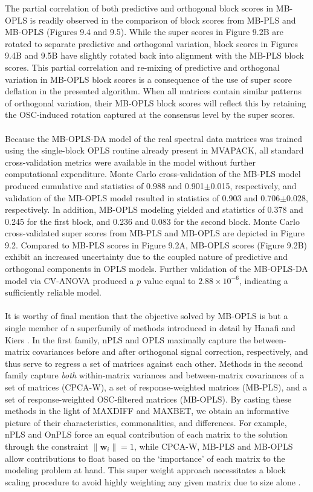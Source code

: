 \begin{doublespace}
The partial correlation of both predictive and orthogonal block scores in
MB-OPLS is readily observed in the comparison of block scores from MB-PLS
and MB-OPLS (Figures 9.4 and 9.5). While the super scores in Figure 9.2B
are rotated to separate predictive and orthogonal variation, block scores
in Figures 9.4B and 9.5B have slightly rotated back into alignment with
the MB-PLS block scores. This partial correlation and re-mixing of
predictive and orthogonal variation in MB-OPLS block scores is a consequence
of the use of super score deflation in the presented algorithm. When all
matrices contain similar patterns of orthogonal variation, their MB-OPLS
block scores will reflect this by retaining the OSC-induced rotation captured
at the consensus level by the super scores.
\\\\
Because the MB-OPLS-DA model of the real spectral data matrices was trained
using the single-block OPLS routine already present in MVAPACK, all standard
cross-validation metrics were available in the model without further
computational expenditure. Monte Carlo cross-validation of the MB-PLS model
produced cumulative \rsqy{} and \qsq{} statistics of 0.988 and
0.901$\pm$0.015, respectively, and validation of the MB-OPLS model resulted
in statistics of 0.903 and 0.706$\pm$0.028, respectively. In addition, MB-OPLS
modeling yielded \rsqxp{} and \rsqxo{} statistics of 0.378 and 0.245 for the
first block, and 0.236 and 0.083 for the second block. Monte Carlo
cross-validated super scores from MB-PLS and MB-OPLS are depicted in
Figure 9.2. Compared to MB-PLS scores in Figure 9.2A, MB-OPLS scores
(Figure 9.2B) exhibit an increased uncertainty due to the coupled nature
of predictive and orthogonal components in OPLS models. Further validation
of the MB-OPLS-DA model via CV-ANOVA produced a $p$ value equal to
$2.88 \times 10^{-6}$, indicating a sufficiently reliable model.
\\\\
It is worthy of final mention that the objective solved by MB-OPLS is but a
single member of a superfamily of methods introduced in detail by Hanafi
and Kiers \cite{hanafi:csda2006}. In the first family, nPLS and OPLS maximally
capture the between-matrix covariances before and after orthogonal signal
correction, respectively, and thus serve to regress a set of matrices
against each other. Methods in the second family capture \emph{both}
within-matrix variances and between-matrix covariances of a set of matrices
(CPCA-W), a set of response-weighted matrices (MB-PLS), and a set of
response-weighted OSC-filtered matrices (MB-OPLS). By casting these methods
in the light of MAXDIFF and MAXBET, we obtain an informative picture of their
characteristics, commonalities, and differences. For example, nPLS and OnPLS
force an equal contribution of each matrix to the solution through the
constraint $\|\mathbf{w}_i\|=1$, while CPCA-W, MB-PLS and MB-OPLS allow
contributions to float based on the `importance' of each matrix to the
modeling problem at hand. This super weight approach necessitates a block
scaling procedure to avoid highly weighting any given matrix due to size
alone \cite{smilde:jchemo2003,westerhuis:jchemo1998}.
\end{doublespace}

